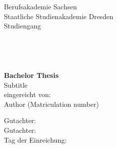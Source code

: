 
\begin{titlepage}
 
\begin{minipage}[t][0cm][t]{0.5\textwidth}
\begin{flushleft}
Berufsakademie Sachsen\\[-0.1cm]
Staatliche Studienakademie Dresden\\[-0.1cm]
Studiengang
\end{flushleft}
\end{minipage}
~
\begin{minipage}[t][0cm][t]{0.4\textwidth}
\begin{flushright}

\end{flushright}
\end{minipage}\\[5cm]


\begin{center}

{\bfseries Bachelor Thesis}\\[3cm]

Subtitle\\[1.8cm]

eingereicht von:\\[0.2cm]
Author (Matriculation number)\\[5cm]
\end{center}
 
\begin{minipage}{0.9\textwidth}
\begin{flushleft}
Gutachter: \\[0.2cm]
Gutachter: \\[0.2cm]
Tag der Einreichung: \\[0.2cm]
\end{flushleft}
\end{minipage}
~
\begin{minipage}{0.1\textwidth}
\begin{flushright}

\end{flushright}
\end{minipage}

\vfill

\end{titlepage}